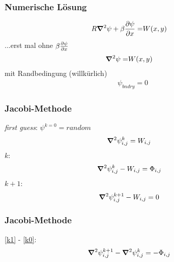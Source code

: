 \begin{frame}
\frametitle{Numerische Lösung}
\begin{align}
    R \mathbf{\bm{\nabla}}^2 \psi  +  \beta \frac{\partial\psi}{\partial x}\nonumber
	=&
	 W(x,y)
\end{align}
...erst mal ohne $\beta \frac{\partial\psi}{\partial x}$
\pause
\begin{align}
    \mathbf{\bm{\nabla}}^2 \psi
	=&
	 W(x,y)\nonumber
\end{align}
\pause
mit Randbedingung (willkürlich)
\begin{align}
	\psi_{bndry} = 0	\nonumber
\end{align}
\end{frame}


\begin{frame}
\frametitle{Jacobi-Methode}
\textit{first guess}: $\psi^{k=0}=random$ \\
\begin{align}
     \mathbf{\bm{\nabla}}^2 \psi^k_{i,j} 
    &=
     W_{i,j} \nonumber
\end{align}
\pause
$k$:
\begin{align}
     \mathbf{\bm{\nabla}}^2 \psi^k_{i,j}  - W_{i,j}
    &=
    \Phi_{i,j} \label{k0}
\end{align}
\pause
$k+1$:
\begin{align}
     \mathbf{\bm{\nabla}}^2 \psi^{k+1}_{i,j}  - W_{i,j}
    &=
   0 \label{k1}
\end{align}
\end{frame}

\begin{frame}
\frametitle{Jacobi-Methode}
\eqref{k1} - \eqref{k0}:
\begin{align}
	\mathbf{\bm{\nabla}}^2 \psi^{k+1}_{i,j} - \mathbf{\bm{\nabla}}^2 \psi^{k}_{i,j}
    &=
    -\Phi_{i,j} 	
\end{align}
\end{frame}


